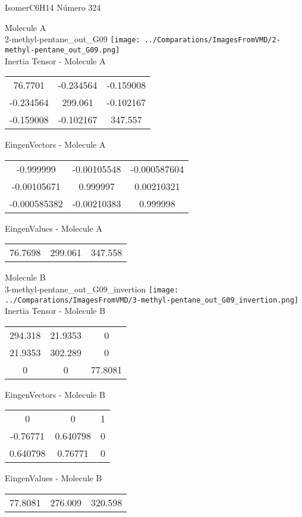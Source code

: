 \vtab[-2cm]
\begin{center}
{\large IsomerC6H14 \tab Número 324}
\end{center}
\begin{multicols}{2}
\begin{center}

Molecule A \\ 
2-methyl-pentane\_out\_G09
\texttt{[image: ../Comparations/ImagesFromVMD/2-methyl-pentane\_out\_G09.png]}
\\
Inertia Tensor - Molecule A \\
\vtab

\begin{tabular}{|c c c|}
76.7701	 & 	-0.234564	 & 	-0.159008	 \\
-0.234564	 & 	299.061	 & 	-0.102167	 \\
-0.159008	 & 	-0.102167	 & 	347.557
\end{tabular}

\vtab
 EingenVectors - Molecule A     \\
\vtab
\begin{tabular}{|c c c|}
-0.999999	 & 	-0.00105548	 & 	-0.000587604	 \\
-0.00105671	 & 	0.999997	 & 	0.00210321	 \\
-0.000585382	 & 	-0.00210383	 & 	0.999998
\end{tabular}

\vtab
 EingenValues - Molecule A     \\
\vtab
\begin{tabular}{|c c c|}
76.7698	 & 	299.061	 & 	347.558	 \\
\end{tabular}
\columnbreak

Molecule B \\ 
3-methyl-pentane\_out\_G09\_invertion
\texttt{[image: ../Comparations/ImagesFromVMD/3-methyl-pentane\_out\_G09\_invertion.png]}
\\
Inertia Tensor - Molecule B \\
\vtab

\begin{tabular}{|c c c|}
294.318	 & 	21.9353	 & 	0	 \\
21.9353	 & 	302.289	 & 	0	 \\
0	 & 	0	 & 	77.8081
\end{tabular}

\vtab
 EingenVectors - Molecule B     \\
\vtab
\begin{tabular}{|c c c|}
0	 & 	0	 & 	1	 \\
-0.76771	 & 	0.640798	 & 	0	 \\
0.640798	 & 	0.76771	 & 	0
\end{tabular}

\vtab
 EingenValues - Molecule B     \\
\vtab
\begin{tabular}{|c c c|}
77.8081	 & 	276.009	 & 	320.598	 \\
\end{tabular}

\end{center}
\end{multicols}
